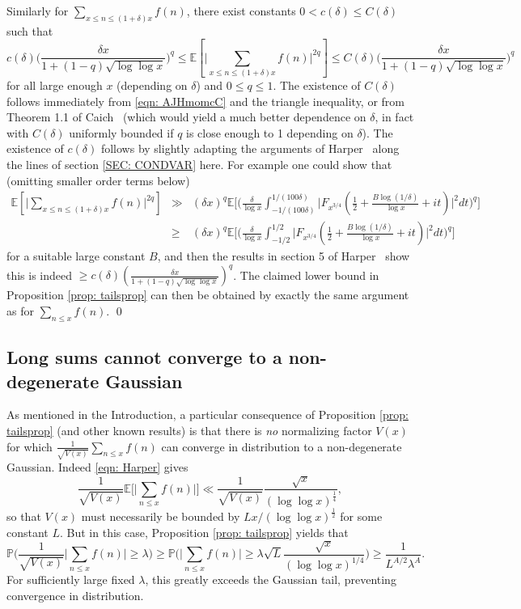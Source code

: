 \documentclass[12pt, notitlepage]{amsart}
\numberwithin{equation}{section}
\def\P{\mathbb P}
\def\E{\mathbb E}
\theoremstyle{remark}
\theoremstyle{definition}
\theoremstyle{remark}
\numberwithin{equation}{section}
\begin{document}
\vspace{12pt}
Similarly for $\sum_{x \leq n \leq (1+\delta)x} f(n)$, there exist constants $0 < c(\delta) \leq C(\delta)$ such that
\begin{equation}
c(\delta) \Big( \frac{\delta x}{1 + (1-q)\sqrt{\log\log x}} \Big)^q \leq \E[\Big|\sum_{x \leq n \leq (1+\delta)x} f(n) \Big|^{2q}] \leq C(\delta) \Big( \frac{\delta x}{1 + (1-q)\sqrt{\log\log x}} \Big)^q
\end{equation}
for all large enough $x$ (depending on $\delta$) and $0 \leq q \leq 1$. The existence of $C(\delta)$ follows immediately from \eqref{eqn: AJHmomcC} and the triangle inequality, or from Theorem 1.1 of Caich~\cite{caichshort} (which would yield a much better dependence on $\delta$, in fact with $C(\delta)$ uniformly bounded if $q$ is close enough to 1 depending on $\delta$). The existence of $c(\delta)$ follows by slightly adapting the arguments of Harper~\cite{HarperLow} along the lines of section \ref{SEC: CONDVAR} here.  For example one could show that 
(omitting smaller order terms below) 
\begin{eqnarray}
\E[\Big|\sum_{x \leq n \leq (1+\delta)x} f(n) \Big|^{2q}] & \gg & (\delta x)^q \E\Big[\Big(\frac{\delta}{\log x} \int_{-1/(100\delta)}^{1/(100\delta)} \Big|F_{x^{3/4}}(\tfrac{1}{2} + \tfrac{B\log(1/\delta)}{\log x} +it)\Big|^{2} dt \Big)^{q}\Big]  \nonumber \\
& \geq & (\delta x)^q \E\Big[\Big(\frac{\delta}{\log x} \int_{-1/2}^{1/2} \Big|F_{x^{3/4}}(\tfrac{1}{2} + \tfrac{B\log(1/\delta)}{\log x} +it)\Big|^{2} dt \Big)^{q}\Big] \nonumber
\end{eqnarray}
for a suitable large constant $B$, and then the results in section 5 of Harper~\cite{HarperLow} show this is indeed $\geq c(\delta) \left( \frac{\delta x}{1 + (1-q)\sqrt{\log\log x}} \right)^q$. %
The claimed lower bound in Proposition \ref{prop: tailsprop} can then be obtained by exactly the same argument as for $\sum_{n \leq x} f(n)$.
\qed


\subsection{Long sums cannot converge to a non-degenerate Gaussian}
As mentioned in the Introduction, a particular consequence of Proposition \ref{prop: tailsprop} (and other known results) is that there is {\em no} normalizing factor $V(x)$ for which $\frac{1}{\sqrt{V(x)}} \sum_{n \leq x} f(n)$ can converge in distribution to a non-degenerate Gaussian. Indeed \eqref{eqn: Harper} gives 
$$
 \frac{1}{\sqrt{V(x)}} \E\Big[\Big|\sum_{n \leq x} f(n)\Big|\Big] \ll \frac{1}{\sqrt{V(x)}} \frac{\sqrt{x}}{(\log\log x)^{\frac 14}}, 
$$
so that $V(x)$ must necessarily be bounded by $L {x}/(\log \log x)^{\frac 12}$ for some constant $L$.  But in this case, Proposition \ref{prop: tailsprop} yields that
$$ 
\P\Big(\frac{1}{\sqrt{V(x)}} \Big|\sum_{n \leq x} f(n)\Big| \geq \lambda \Big) \geq \P\Big(\Big|\sum_{n \leq x} f(n)\Big| \geq \lambda \sqrt{L} \frac{\sqrt{x}}{(\log\log x)^{1/4}} \Big) \geq \frac{1}{L^{A/2} \lambda^A} . $$
For sufficiently large fixed $\lambda$, this greatly exceeds the Gaussian tail, preventing convergence in distribution.
\end{document}
